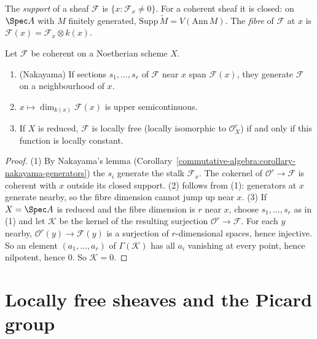 \begin{definition}\label{schemes:definition-support}
The \emph{support} of a sheaf $\mathcal{F}$ is $\{x : \mathcal{F}_x \neq 0\}$. For a coherent sheaf it is closed: on $\Spec A$ with $M$ finitely generated,
$\mathrm{Supp}\,\widetilde M = V(\mathrm{Ann}\,M)$. The \emph{fibre} of $\mathcal{F}$ at $x$ is $\mathcal{F}(x) = \mathcal{F}_x \otimes k(x)$.
\end{definition}

\begin{proposition}\label{schemes:proposition-fibre-dimension}
Let $\mathcal{F}$ be coherent on a Noetherian scheme $X$.
\begin{enumerate}
\item (Nakayama) If sections $s_1, \ldots, s_r$ of $\mathcal{F}$ near $x$ span $\mathcal{F}(x)$, they generate $\mathcal{F}$ on a neighbourhood of $x$.
\item $x \mapsto \dim_{k(x)}\mathcal{F}(x)$ is upper semicontinuous.
\item If $X$ is reduced, $\mathcal{F}$ is locally free (locally isomorphic to $\mathcal{O}_X^r$) if and only if this function is locally constant.
\end{enumerate}
\end{proposition}

\begin{proof}
(1) By Nakayama's lemma (Corollary~\ref{commutative-algebra:corollary-nakayama-generators}) the $s_i$ generate the stalk $\mathcal{F}_x$. The cokernel of
$\mathcal{O}^r \to \mathcal{F}$ is coherent with $x$ outside its closed support. (2) follows from (1): generators at $x$ generate nearby, so the
fibre dimension cannot jump up near $x$. (3) If $X = \Spec A$ is reduced and the fibre dimension is $r$ near $x$, choose $s_1, \ldots, s_r$ as in (1) and
let $\mathcal{K}$ be the kernel of the resulting surjection $\mathcal{O}^r \to \mathcal{F}$. For each $y$ nearby, $\mathcal{O}^r(y) \to \mathcal{F}(y)$ is a
surjection of $r$-dimensional spaces, hence injective. So an element $(a_1, \ldots, a_r)$ of $\Gamma(\mathcal{K})$ has all $a_i$ vanishing at every point,
hence nilpotent, hence $0$. So $\mathcal{K} = 0$.
\end{proof}

\section{Locally free sheaves and the Picard group}\label{schemes:section-locally-free}

